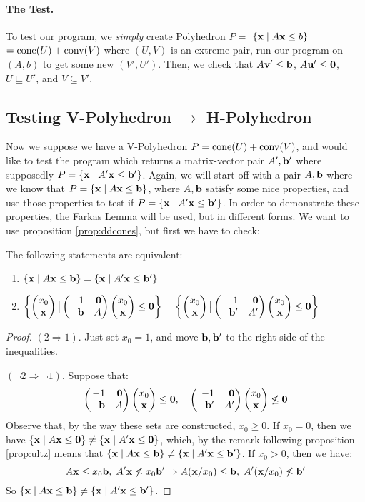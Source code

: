 \paragraph{The Test.}  To test our program, we \textit{simply} create Polyhedron $P =$ $\left\{\mathbf{x}\;|\; A\mathbf{x}\leq b\right\}$ $= \operatorname{cone}(U) + \operatorname{conv}(V)$ where $(U,V)$ is an extreme pair, run our program on $(A,b)$ to get some new $(V',U')$.  Then, we check that $A\mathbf{v}' \leq \mathbf{b}$, $A\mathbf{u}'\leq\mathbf{0}$, $U\sqsubseteq U'$, and $V\subseteq V'$.

\subsection{Testing V-Polyhedron $\to$ H-Polyhedron}
Now we suppose we have a V-Polyhedron $P = \operatorname{cone}(U) + \operatorname{conv}(V)$, and would like to test the program which returns a matrix-vector pair $A',\mathbf{b}'$ where supposedly $P = \left\{\mathbf{x}\;|\; A'\mathbf{x}\leq \mathbf{b}'\right\}$.  Again, we will start off with a pair $A,\mathbf{b}$ where we know that $P = \left\{\mathbf{x}\;|\; A\mathbf{x}\leq \mathbf{b}\right\}$, where $A,\mathbf{b}$ satisfy some nice properties, and use those properties to test if $P = \left\{\mathbf{x}\;|\; A'\mathbf{x}\leq \mathbf{b}'\right\}$.  In order to demonstrate these properties, the Farkas Lemma will be used, but in different forms.  We want to use proposition \ref{prop:ddcones}, but first we have to check:

\begin{Prop}{\label{prop:homog}
		The following statements are equivalent:
		\begin{enumerate}
			\item $\left\{\mathbf{x}\;|\; A\mathbf{x}\leq \mathbf{b}\right\} = \left\{\mathbf{x}\;|\; A'\mathbf{x}\leq \mathbf{b}'\right\}$
			\item $\set{\xx \big| \pmb -1 & \0 \\ -\b & A \pme \xx \leq \0} =
				      \set{\xx \big| \pmb -1 & \0 \\ -\b' & A' \pme \xx \leq \0}$
		\end{enumerate}
	}\end{Prop}

\begin{proof}
	$(2 \Rightarrow 1)$.  Just set $x_0 = 1$, and move $\mathbf{b},\mathbf{b}'$ to the right side of the inequalities.

	$(\neg 2 \Rightarrow \neg 1)$.  Suppose that:
	\[ \pmb -1 & \0 \\ -\b & A \pme \xx \leq \0,\quad
		\pmb -1 & \0 \\ -\b' & A' \pme \xx \not\leq \0 \]
	Observe that, by the way these sets are constructed, $x_0 \geq 0$.  If $x_0 = 0$, then we have $\left\{\mathbf{x}\;|\; A\mathbf{x}\leq\mathbf{0}\right\} \neq \left\{\mathbf{x}\;|\; A'\mathbf{x}\leq\mathbf{0}\right\}$, which, by the remark following proposition \ref{prop:ultz} means that $\left\{\mathbf{x}\;|\; A\mathbf{x}\leq \mathbf{b}\right\} \neq \left\{\mathbf{x}\;|\; A'\mathbf{x}\leq \mathbf{b}'\right\}$.  If $x_0 > 0$, then we have:
	\[ A\mathbf{x} \leq x_0\mathbf{b},\;A'\mathbf{x}\not\leq x_0\mathbf{b}' \Rightarrow A(\mathbf{x}/x_0)\leq\mathbf{b},\;A'(\mathbf{x}/x_0)\not\leq\mathbf{b}' \]
	So $\left\{\mathbf{x}\;|\; A\mathbf{x}\leq \mathbf{b}\right\} \neq \left\{\mathbf{x}\;|\; A'\mathbf{x}\leq \mathbf{b}'\right\}$.
\end{proof}

